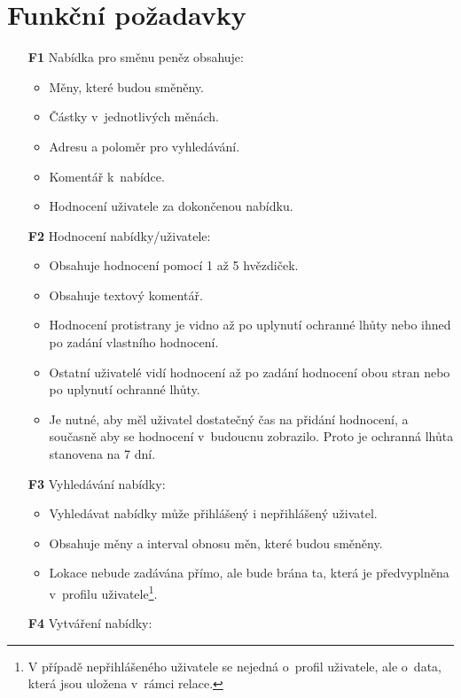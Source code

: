 \section{Funkční požadavky}
\begin{itemize}
    \item[\textbf{F1}] Nabídka pro směnu peněz obsahuje:
        \begin{itemize}
            \item Měny, které budou směněny.
            \item Částky v~jednotlivých měnách.
            \item Adresu a poloměr pro vyhledávání.
            \item Komentář k~nabídce.
            \item Hodnocení uživatele za dokončenou nabídku.
        \end{itemize}
    \item[\textbf{F2}] Hodnocení nabídky/uživatele:
        \begin{itemize}
            \item Obsahuje hodnocení pomocí 1 až 5 hvězdiček.
            \item Obsahuje textový komentář.
            \item Hodnocení protistrany je vidno až po uplynutí ochranné lhůty nebo ihned po zadání vlastního hodnocení.
            \item Ostatní uživatelé vidí hodnocení až po zadání hodnocení obou stran nebo po uplynutí ochranné lhůty.
            \item Je nutné, aby měl uživatel dostatečný čas na přidání hodnocení, a současně aby se hodnocení v~budoucnu zobrazilo. Proto je ochranná lhůta stanovena na 7 dní.
        \end{itemize}
    \item[\textbf{F3}] Vyhledávání nabídky:
        \begin{itemize}
            \item Vyhledávat nabídky může přihlášený i nepřihlášený uživatel.
            \item Obsahuje měny a interval obnosu měn, které budou směněny.
            \item Lokace nebude zadávána přímo, ale bude brána ta, která je předvyplněna v~profilu uživatele\footnote{V případě nepřihlášeného uživatele se nejedná o~profil uživatele, ale o~data, která jsou uložena v~rámci relace.}.
        \end{itemize}
    \item[\textbf{F4}] Vytváření nabídky:

\end{itemize}

